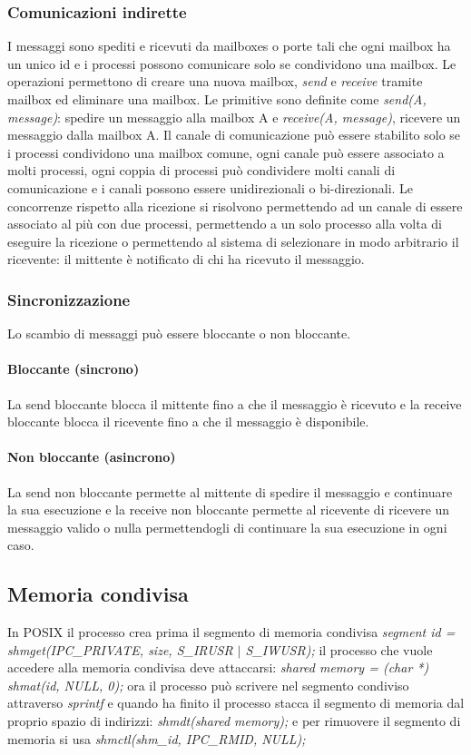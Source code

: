 \subsubsection{Comunicazioni indirette}
I messaggi sono spediti e ricevuti da mailboxes o porte tali che ogni mailbox ha un unico id e i processi possono comunicare solo se condividono una mailbox. Le operazioni permettono
di creare una nuova mailbox, \emph{send} e \emph{receive} tramite mailbox ed eliminare una mailbox. Le primitive sono definite come \emph{send(A, message)}: spedire un messaggio alla
mailbox A e \emph{receive(A, message)}, ricevere un messaggio dalla mailbox A. Il canale di comunicazione pu\`o essere stabilito solo se i processi condividono una mailbox comune, 
ogni canale pu\`o essere associato a molti processi, ogni coppia di processi pu\`o condividere molti canali di comunicazione e i canali possono essere unidirezionali o bi-direzionali. Le
concorrenze rispetto alla ricezione si risolvono permettendo ad un canale di essere associato al pi\`u con due processi, permettendo a un solo processo alla volta di eseguire la 
ricezione o permettendo al sistema di selezionare in modo arbitrario il ricevente: il mittente \`e notificato di chi ha ricevuto il messaggio. 
\subsubsection{Sincronizzazione}
Lo scambio di messaggi pu\`o essere bloccante o non bloccante.
\paragraph{Bloccante (sincrono)}
La send bloccante blocca il mittente fino a che il messaggio \`e ricevuto e la receive bloccante blocca il ricevente fino a che il messaggio \`e disponibile. 
\paragraph{Non bloccante (asincrono)}
La send non bloccante permette al mittente di spedire il messaggio e continuare la sua esecuzione e la receive non bloccante permette al ricevente di ricevere un messaggio valido o 
nulla permettendogli di continuare la sua esecuzione in ogni caso. 
\subsection{Memoria condivisa}
In POSIX il processo crea prima il segmento di memoria condivisa \emph{segment id = shmget(IPC\_PRIVATE, size, S\_IRUSR $|$ S\_IWUSR);} il processo che vuole accedere alla memoria
condivisa deve attaccarsi: \emph{shared memory = (char *) shmat(id, NULL, 0);} ora il processo pu\`o scrivere nel segmento condiviso attraverso \emph{sprintf} e quando ha finito il 
processo stacca il segmento di memoria dal proprio spazio di indirizzi: \emph{shmdt(shared memory);} e per rimuovere il segmento di memoria si usa 
\emph{shmctl(shm\_id, IPC\_RMID, NULL);}
